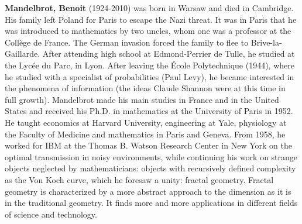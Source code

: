 \textbf{Mandelbrot, Benoit} (1924-2010) was born in Warsaw and died in Cambridge. His family left Poland for Paris to escape the Nazi threat. It was in Paris that he was introduced to mathematics by two uncles, whom one was a professor at the Collège de France. The German invasion forced the family to flee to Brive-la-Gaillarde. After attending high school at Edmond-Perrier de Tulle, he studied at the Lycée du Parc, in Lyon. After leaving the École Polytechnique (1944), where he studied with a specialist of probabilities (Paul Levy), he became interested in the phenomena of information (the ideas Claude Shannon were at this time in full growth). Mandelbrot made his main studies in France and in the United States and received his Ph.D. in mathematics at the University of Paris in 1952. He taught economics at Harvard University, engineering at Yale, physiology at the Faculty of Medicine and mathematics in Paris and Geneva. From 1958, he worked for IBM at the Thomas B. Watson Research Center in New York on the optimal transmission in noisy environments, while continuing his work on strange objects neglected by mathematicians: objects with recursively defined complexity as the Von Koch curve, which he foresaw a unity: fractal geometry. Fractal geometry is characterized by a more abstract approach to the dimension as it is in the traditional geometry. It finds more and more applications in different fields of science and technology.

